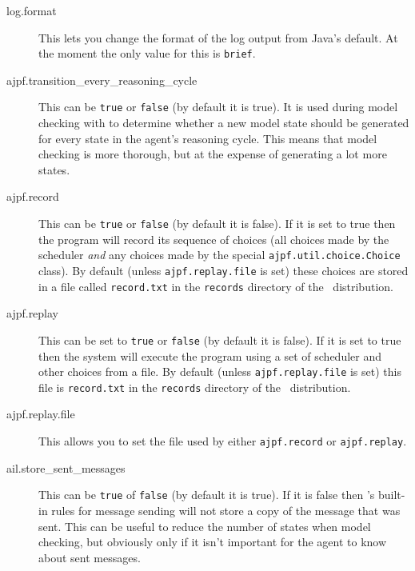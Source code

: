 \begin{description}
\item[log.format] This lets you change the format of the log output from Java's default.  At the moment the only value for this is \texttt{brief}.
\item[ajpf.transition\_every\_reasoning\_cycle] This can be \texttt{true} or \texttt{false} (by default it is true).  It is used during model checking with \ajpf{} to determine whether a new model state should be generated for every state in the agent's reasoning cycle.  This means that model checking is more thorough, but at the expense of generating a lot more states.
\item[ajpf.record] This can be \texttt{true} or \texttt{false} (by default  it is false).  If it is set to true then the program will record its sequence of choices (all choices made by the scheduler \emph{and} any choices made by the special \texttt{ajpf.util.choice.Choice} class).  By default (unless \texttt{ajpf.replay.file} is set) these choices are stored in a file called \texttt{record.txt} in the \texttt{records} directory of the \mcapl\ distribution.
\item[ajpf.replay] This can be set to \texttt{true} or \texttt{false} (by default it is false).  If it is set to true then the system will execute the program using a set of scheduler and other choices from a file.  By default (unless \texttt{ajpf.replay.file} is set) this  file is  \texttt{record.txt} in the \texttt{records} directory of the \mcapl\ distribution.
\item[ajpf.replay.file] This allows you to set the file used by either \texttt{ajpf.record} or \texttt{ajpf.replay}.
\item[ail.store\_sent\_messages]  This can be \texttt{true} of \texttt{false} (by default it is true).  If it is false then \ail{}'s built-in rules for message sending will not store a copy of the message that was sent.  This can be useful to reduce the number of states when model checking, but obviously only if it isn't important for the agent to know about sent messages.
\end{description}


